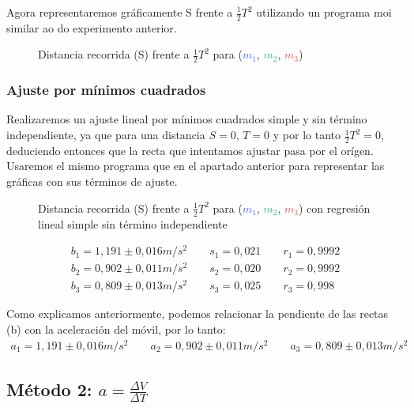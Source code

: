 \documentclass[12pt, a4paper, titlepage]{article}
\begin{document}
  Agora representaremos gráficamente S frente a $\frac{1}{2}T^2$ utilizando un programa moi similar ao do experimento anterior.

  \begin{figure}[H]
    \centering
     
    
    \caption{Distancia recorrida (S) frente a $\frac{1}{2}T^2$ para  (\textcolor{RoyalBlue}{$m_1$}, \textcolor{MediumSeaGreen}{$m_2$}, \textcolor{IndianRed}{$m_3$})}
  \end{figure}

  \newpage
  \subsubsection{Ajuste por mínimos cuadrados}

  Realizaremos un ajuste lineal por mínimos cuadrados simple y sin término independiente, ya que para una distancia $S=0$, $T=0$ y por lo tanto $\frac{1}{2}T^2 = 0$, deduciendo entonces que la recta que intentamos ajustar pasa por el orígen. Usaremos el mismo programa que en el apartado anterior para representar las gráficas con sus términos de ajuste.

  \begin{figure}[H]
    \centering
     
    
    \caption{Distancia recorrida (S) frente a $\frac{1}{2}T^2$ para  (\textcolor{RoyalBlue}{$m_1$}, \textcolor{MediumSeaGreen}{$m_2$}, \textcolor{IndianRed}{$m_3$}) con regresión lineal simple sin término independiente}
  \end{figure}
  \begin{gather*}
    b_1 = 1,191 \pm 0,016 m/s^2 \qquad s_1 = 0,021 \qquad r_1 = 0,9992 \\
    b_2 = 0,902 \pm 0,011 m/s^2 \qquad s_2 = 0,020 \qquad r_2 = 0,9992 \\
    b_3 = 0,809 \pm 0,013 m/s^2 \qquad s_3 = 0,025 \qquad r_3 = 0,998
  \end{gather*}

  Como explicamos anteriormente, podemos relacionar la pendiente de las rectas (b) con la aceleración del móvil, por lo tanto:
  \begin{gather*}
    a_1 = 1,191 \pm 0,016 m/s^2 \qquad a_2 = 0,902 \pm 0,011 m/s^2 \qquad a_3 = 0,809 \pm 0,013 m/s^2
  \end{gather*}

  \newpage
  \subsection{Método 2: $a = \frac{\Delta V}{\Delta T}$}
\end{document}
